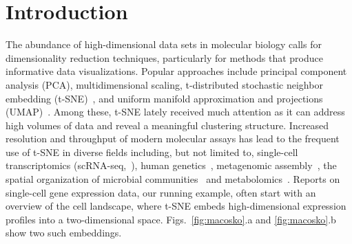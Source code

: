 \documentclass[twocolumn]{article}
\begin{document}
\section*{Introduction}

The abundance of high-dimensional data sets in molecular biology calls for
dimensionality reduction techniques, particularly for methods that produce
informative data visualizations. Popular approaches include principal component
analysis (PCA), multidimensional scaling, t-distributed stochastic neighbor
embedding (t-SNE)~\cite{maaten2008visualizing}, and uniform manifold
approximation and projections (UMAP)~\cite{2018arXivUMAP}. Among these, t-SNE
lately received much attention as it can address high volumes of data and reveal
a meaningful clustering structure. Increased resolution and throughput of modern
molecular assays has lead to the frequent use of t-SNE in diverse fields
including, but not limited to, single-cell
transcriptomics (scRNA-seq,~\cite{macosko2015highly,cao2019single,tasic2018shared}),
human genetics~\cite{hirata2019genetic}, metagenomic
assembly~\cite{beaulaurier2018metagenomic}, the spatial organization of
microbial communities~\cite{sheth2019spatial} and
metabolomics~\cite{tkachev2019differences}. Reports on single-cell gene
expression data, our running example, often start with an overview of the cell
landscape, where t-SNE embeds high-dimensional expression profiles into a
two-dimensional space. Figs.~\ref{fig:macosko}.a and \ref{fig:macosko}.b show
two such embeddings.
\end{document}
